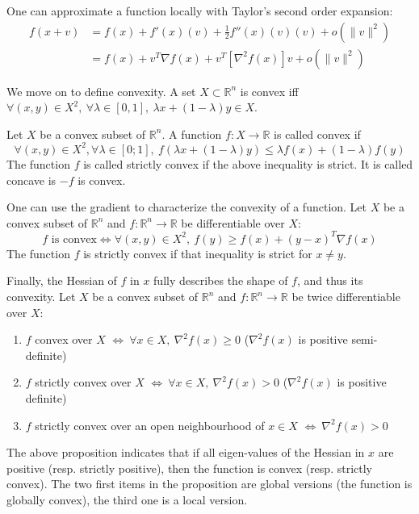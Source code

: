 \documentclass{article}
\begin{document}
\noindent One can approximate a function locally with Taylor's second order expansion:
\begin{align*}
f(x + v) &= f(x) + f'(x)(v) + \frac{1}{2}f''(x)(v)(v) + o(\|v\|^2)\\
&= f(x) + v^T \nabla f(x) + v^T \left[\nabla^2 f(x)\right] v + o(\|v\|^2)
\end{align*}

\noindent We move on to define convexity. A set $X\subset\mathbb{R}^n$ is convex iff $\forall (x,y) \in X^2, \ \forall \lambda \in [0,1], \ \lambda x+(1-\lambda)y \in
X$.

\noindent Let $X$ be a convex subset of $\mathbb{R}^n$. A function $f:X\rightarrow \mathbb{R}$ is called convex if
\begin{equation*}
\forall (x,y)\in X^2, \forall \lambda\in [0;1], \ f\left(\lambda x + (1-\lambda) y\right)
\leq \lambda f(x) + (1-\lambda)f(y)
\end{equation*}
The function $f$ is called strictly convex if the above inequality is strict. It is called concave is $-f$ is convex.

\noindent One can use the gradient to characterize the convexity of a function. Let $X$ be a convex subset of $\mathbb{R}^n$ and $f:\mathbb{R}^n\rightarrow\mathbb{R}$ be differentiable over $X$:
\begin{equation*}
f\textrm{ is convex} \Leftrightarrow \forall (x,y) \in X^2, \ f(y)\geq f(x) + (y-x)^T \nabla f(x)
\end{equation*} 
The function $f$ is strictly convex if that inequality is strict for $x\neq y$.

\noindent Finally, the Hessian of $f$ in $x$ fully describes the shape of $f$, and thus its convexity. Let $X$ be a convex subset of $\mathbb{R}^n$ and $f:\mathbb{R}^n\rightarrow\mathbb{R}$ be twice differentiable over $X$:
\begin{enumerate}
  \item $f$ convex over $X$ $\Leftrightarrow \ \forall x\in X, \ \nabla^2 f(x)\geq 0$ ($\nabla^2 f(x)$ is positive semi-definite)
  \item $f$ strictly convex over $X$ $\Leftrightarrow \ \forall x\in X, \ \nabla^2 f(x)> 0$ ($\nabla^2 f(x)$ is positive definite)
  \item $f$ strictly convex over an open neighbourhood of $x \in X$ $\Leftrightarrow \ \nabla^2 f(x)> 0$
\end{enumerate}

\noindent The above proposition indicates that if all eigen-values of the Hessian in $x$ are positive (resp. strictly positive), then the function is convex (resp. strictly convex). The two first items in the proposition are global versions (the function is globally convex), the third one is a local version.
\end{document}
